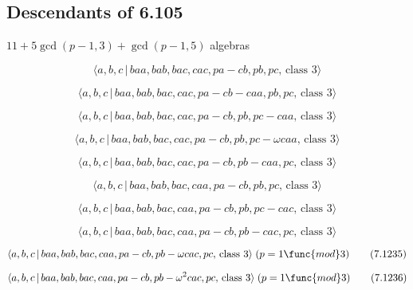 \documentclass[10pt]{article}
\begin{document}
\subsection{Descendants of 6.105}

$11+5\gcd (p-1,3)+\gcd (p-1,5)$ algebras

\begin{equation}
\langle a,b,c\,|\,baa,bab,bac,cac,pa-cb,pb,pc,\,\text{class }3\rangle 
\tag{7.1227}
\end{equation}

\begin{equation}
\langle a,b,c\,|\,baa,bab,bac,cac,pa-cb-caa,pb,pc,\,\text{class }3\rangle 
\tag{7.1228}
\end{equation}

\begin{equation}
\langle a,b,c\,|\,baa,bab,bac,cac,pa-cb,pb,pc-caa,\,\text{class }3\rangle 
\tag{7.1229}
\end{equation}

\begin{equation}
\langle a,b,c\,|\,baa,bab,bac,cac,pa-cb,pb,pc-\omega caa,\,\text{class }%
3\rangle  \tag{7.1230}
\end{equation}

\begin{equation}
\langle a,b,c\,|\,baa,bab,bac,cac,pa-cb,pb-caa,pc,\,\text{class }3\rangle 
\tag{7.1231}
\end{equation}

\begin{equation}
\langle a,b,c\,|\,baa,bab,bac,caa,pa-cb,pb,pc,\,\text{class }3\rangle 
\tag{7.1232}
\end{equation}

\begin{equation}
\langle a,b,c\,|\,baa,bab,bac,caa,pa-cb,pb,pc-cac,\,\text{class }3\rangle 
\tag{7.1233}
\end{equation}

\begin{equation}
\langle a,b,c\,|\,baa,bab,bac,caa,pa-cb,pb-cac,pc,\,\text{class }3\rangle 
\tag{7.1234}
\end{equation}

\begin{equation}
\langle a,b,c\,|\,baa,bab,bac,caa,pa-cb,pb-\omega cac,pc,\,\text{class }%
3\rangle \;(p=1\func{mod}3)  \tag{7.1235}
\end{equation}

\begin{equation}
\langle a,b,c\,|\,baa,bab,bac,caa,pa-cb,pb-\omega ^{2}cac,pc,\,\text{class }%
3\rangle \;(p=1\func{mod}3)  \tag{7.1236}
\end{equation}
\end{document}
